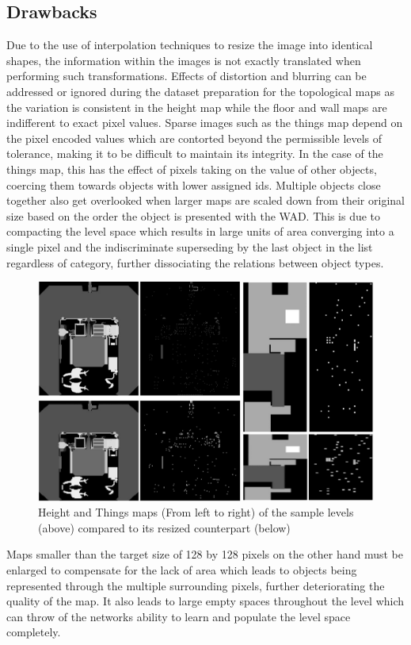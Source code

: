 \documentclass{Configuration_Files/PoliMi3i_thesis}
\begin{document}
\subsection{Drawbacks}
Due to the use of interpolation techniques to resize the image into identical shapes, 
the information within the images is not exactly translated when performing such 
transformations. Effects of distortion and blurring can be addressed or ignored 
during the dataset preparation for the topological maps as the variation is consistent 
in the height map while the floor and wall maps are indifferent to exact pixel values. 
Sparse images such as the things map depend on the pixel encoded values which are 
contorted beyond the permissible levels of tolerance, making it to be difficult to 
maintain its integrity. In the case of the things map, this has the effect of pixels taking 
on the value of other objects, coercing them towards objects with lower assigned ids. 
Multiple objects close together also get overlooked when larger maps are scaled 
down from their original size based on the order the object is presented with the 
WAD. This is due to compacting the level space which results in large units of area 
converging into a single pixel and the indiscriminate superseding by the last object in 
the list regardless of category, further dissociating the relations between object types.
\begin{figure}[H]
    \centering
    \includegraphics[width=1\textwidth]{feature_map_mistakes.jpg}
    \caption[Resized feature maps comparison]{Height and Things maps (From left to right) of the sample levels (above) 
compared to its resized counterpart (below)}
    \label{fig:featuremapistakes}
\end{figure}
Maps smaller than the target size of 128 by 128 pixels on the other hand must be 
enlarged to compensate for the lack of area which leads to objects being represented 
through the multiple surrounding pixels, further deteriorating the quality of the 
map. It also leads to large empty spaces throughout the level which can throw of the 
networks ability to learn and populate the level space completely.
\end{document}
